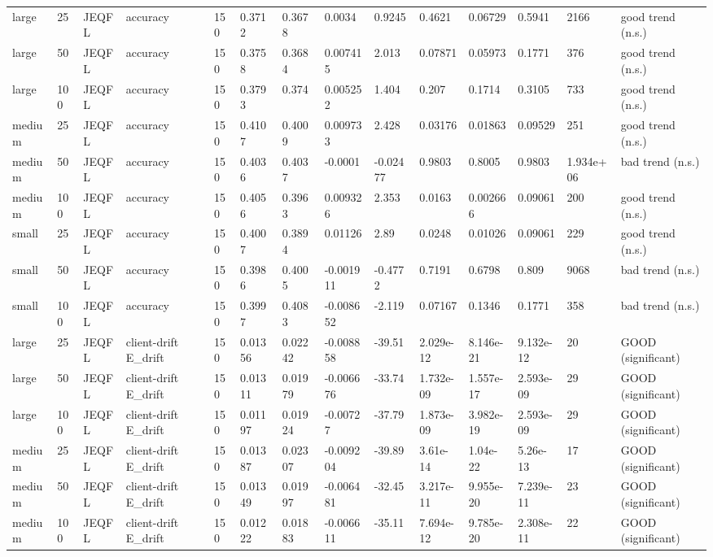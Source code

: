 \begin{table}[t]
\begin{tabular}{llllllllllllll}
large & 25 & JEQFL & accuracy & 150 & 0.3712 & 0.3678 & 0.0034 & 0.9245 & 0.4621 & 0.06729 & 0.5941 & 2166 & good trend (n.s.) \\
large & 50 & JEQFL & accuracy & 150 & 0.3758 & 0.3684 & 0.007415 & 2.013 & 0.07871 & 0.05973 & 0.1771 & 376 & good trend (n.s.) \\
large & 100 & JEQFL & accuracy & 150 & 0.3793 & 0.374 & 0.005252 & 1.404 & 0.207 & 0.1714 & 0.3105 & 733 & good trend (n.s.) \\
medium & 25 & JEQFL & accuracy & 150 & 0.4107 & 0.4009 & 0.009733 & 2.428 & 0.03176 & 0.01863 & 0.09529 & 251 & good trend (n.s.) \\
medium & 50 & JEQFL & accuracy & 150 & 0.4036 & 0.4037 & -0.0001 & -0.02477 & 0.9803 & 0.8005 & 0.9803 & 1.934e+06 & bad trend (n.s.) \\
medium & 100 & JEQFL & accuracy & 150 & 0.4056 & 0.3963 & 0.009326 & 2.353 & 0.0163 & 0.002666 & 0.09061 & 200 & good trend (n.s.) \\
small & 25 & JEQFL & accuracy & 150 & 0.4007 & 0.3894 & 0.01126 & 2.89 & 0.0248 & 0.01026 & 0.09061 & 229 & good trend (n.s.) \\
small & 50 & JEQFL & accuracy & 150 & 0.3986 & 0.4005 & -0.001911 & -0.4772 & 0.7191 & 0.6798 & 0.809 & 9068 & bad trend (n.s.) \\
small & 100 & JEQFL & accuracy & 150 & 0.3997 & 0.4083 & -0.008652 & -2.119 & 0.07167 & 0.1346 & 0.1771 & 358 & bad trend (n.s.) \\
large & 25 & JEQFL & client-drift E\_drift & 150 & 0.01356 & 0.02242 & -0.008858 & -39.51 & 2.029e-12 & 8.146e-21 & 9.132e-12 & 20 & GOOD (significant) \\
large & 50 & JEQFL & client-drift E\_drift & 150 & 0.01311 & 0.01979 & -0.006676 & -33.74 & 1.732e-09 & 1.557e-17 & 2.593e-09 & 29 & GOOD (significant) \\
large & 100 & JEQFL & client-drift E\_drift & 150 & 0.01197 & 0.01924 & -0.00727 & -37.79 & 1.873e-09 & 3.982e-19 & 2.593e-09 & 29 & GOOD (significant) \\
medium & 25 & JEQFL & client-drift E\_drift & 150 & 0.01387 & 0.02307 & -0.009204 & -39.89 & 3.61e-14 & 1.04e-22 & 5.26e-13 & 17 & GOOD (significant) \\
medium & 50 & JEQFL & client-drift E\_drift & 150 & 0.01349 & 0.01997 & -0.006481 & -32.45 & 3.217e-11 & 9.955e-20 & 7.239e-11 & 23 & GOOD (significant) \\
medium & 100 & JEQFL & client-drift E\_drift & 150 & 0.01222 & 0.01883 & -0.006611 & -35.11 & 7.694e-12 & 9.785e-20 & 2.308e-11 & 22 & GOOD (significant) \\

\end{tabular}
\end{table}
